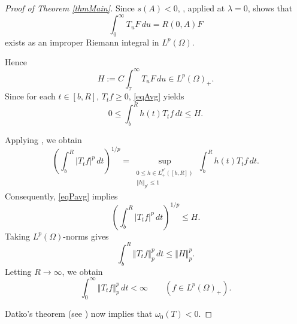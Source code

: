 \documentclass[12pt]{amsart}
\theoremstyle{plain}
\theoremstyle{definition}
\newcommand{\norm}[1]{\left\Vert #1\right\Vert}
\begin{document}
\begin{proof}[Proof of Theorem \ref{thmMain}]
		Since $s(A)<0$, \cite[Proposition 7.1]{DanersGlueckKennedy},
		applied at $\lambda=0$, shows that
		\[
		\int_0^\infty T_uF\,du
		=
		R(0,A)F
		\]
		exists as an improper Riemann integral in $L^p(\Omega)$.
		
		Hence
		\[
		H
		:=
		C\int_\tau^\infty T_uF\,du
		\in L^p(\Omega)_+.
		\]
		Since for each $t \in [b,R]$, $T_tf\ge 0$, \eqref{eqAvg} yields
		\begin{equation}
			\label{eqPavg}
			0
			\le
			\int_b^R h(t)T_tf\,dt
			\le H.
		\end{equation}
		
		Applying \cite[Lemma 1]{Vogt}, we obtain
		\[
		\left(
		\int_b^R|T_tf|^p\,dt
		\right)^{1/p}
		=
		\sup_{\substack{
				0\le h\in L_+^{p'}([b,R])\\
				\norm{h}_{p'}\le 1
		}}
		\int_b^R h(t)T_tf\,dt.
		\]
		Consequently, \eqref{eqPavg} implies
		\[
		\left(
		\int_b^R|T_tf|^p\,dt
		\right)^{1/p}
		\le H.
		\]
		Taking $L^p(\Omega)$-norms gives
		\[
		\int_b^R\norm{T_tf}_p^p\,dt
		\le
		\norm{H}_p^p.
		\]
		Letting $R\to\infty$, we obtain
		\begin{equation}
			\label{eqInteg}
			\int_0^\infty\norm{T_tf}_p^p\,dt
			<\infty
			\qquad
			(f\in L^p(\Omega)_+).
		\end{equation}
		
		Datko's theorem (see \cite[Theorem V.1.8]{EngelNagel}) now implies that $\omega_0(T)<0$.
		
	\end{proof}
	
\end{document}
